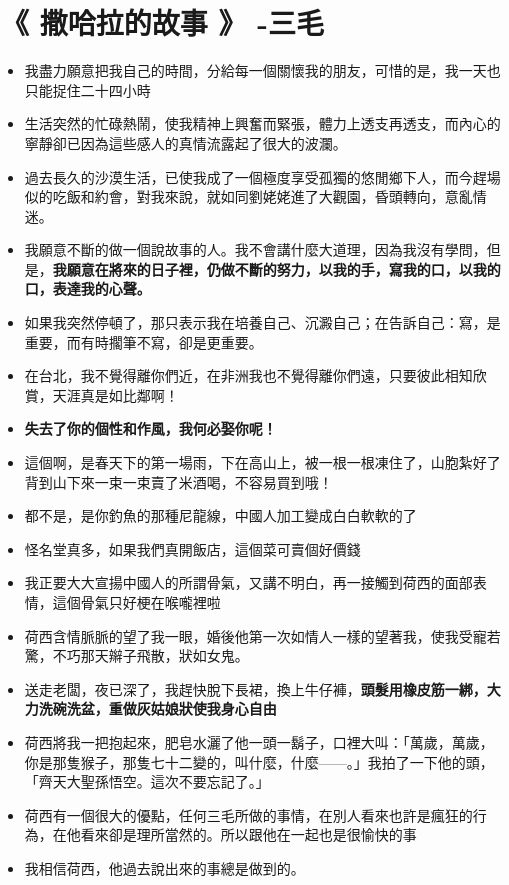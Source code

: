 \documentclass[UTF8,a4paper,8pt]{ctexbook}
\begin{document}
\section{《 撒哈拉的故事 》 -三毛  }
	\begin{itemize}
		\item 我盡力願意把我自己的時間，分給每一個關懷我的朋友，可惜的是，我一天也只能捉住二十四小時
		\item 生活突然的忙碌熱鬧，使我精神上興奮而緊張，體力上透支再透支，而內心的寧靜卻已因為這些感人的真情流露起了很大的波瀾。
		\item 過去長久的沙漠生活，已使我成了一個極度享受孤獨的悠閒鄉下人，而今趕場似的吃飯和約會，對我來說，就如同劉姥姥進了大觀園，昏頭轉向，意亂情迷。
		\item 我願意不斷的做一個說故事的人。我不會講什麼大道理，因為我沒有學問，但是，\textbf{我願意在將來的日子裡，仍做不斷的努力，以我的手，寫我的口，以我的口，表達我的心聲。}
		\item 如果我突然停頓了，那只表示我在培養自己、沉澱自己；在告訴自己：寫，是重要，而有時擱筆不寫，卻是更重要。
		\item 在台北，我不覺得離你們近，在非洲我也不覺得離你們遠，只要彼此相知欣賞，天涯真是如比鄰啊！
		\item \textbf{失去了你的個性和作風，我何必娶你呢！}
		\item 這個啊，是春天下的第一場雨，下在高山上，被一根一根凍住了，山胞紮好了背到山下來一束一束賣了米酒喝，不容易買到哦！
		\item 都不是，是你釣魚的那種尼龍線，中國人加工變成白白軟軟的了
		\item 怪名堂真多，如果我們真開飯店，這個菜可賣個好價錢
		\item 我正要大大宣揚中國人的所謂骨氣，又講不明白，再一接觸到荷西的面部表情，這個骨氣只好梗在喉嚨裡啦
		\item 荷西含情脈脈的望了我一眼，婚後他第一次如情人一樣的望著我，使我受寵若驚，不巧那天辮子飛散，狀如女鬼。
		\item 送走老闆，夜已深了，我趕快脫下長裙，換上牛仔褲，\textbf{頭髮用橡皮筋一綁，大力洗碗洗盆，重做灰姑娘狀使我身心自由}
		\item 荷西將我一把抱起來，肥皂水灑了他一頭一鬍子，口裡大叫：「萬歲，萬歲，你是那隻猴子，那隻七十二變的，叫什麼，什麼——。」我拍了一下他的頭，「齊天大聖孫悟空。這次不要忘記了。」
		\item 荷西有一個很大的優點，任何三毛所做的事情，在別人看來也許是瘋狂的行為，在他看來卻是理所當然的。所以跟他在一起也是很愉快的事
		\item 我相信荷西，他過去說出來的事總是做到的。

\end{itemize}
\end{document}
